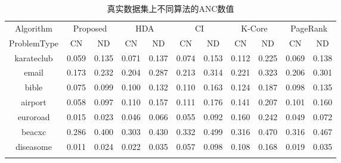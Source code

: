 \begin{table*}[hptb]
    \centering
    \begin{tabular}{ccccccccccc}
        \thickhline 
        Algorithm   & \multicolumn{2}{c}{Proposed} & \multicolumn{2}{c}{HDA} & \multicolumn{2}{c}{CI} & \multicolumn{2}{c}{K-Core} & \multicolumn{2}{c}{PageRank} \\
        ProblemType &      CN      &      ND       &     CN     &     ND     &     CN     &    ND     &     CN      &      ND      &      CN      &      ND       \\
        \hline
        karateclub  &     0.059    &     0.135     &    0.071   &    0.137   &   0.074    &   0.153   &    0.112    &     0.225    &     0.069    &     0.138     \\
        email       &     0.173    &     0.232     &    0.204   &    0.287   &   0.213    &   0.314   &    0.221    &     0.323    &     0.206    &     0.301     \\
        bible       &     0.075    &     0.099     &    0.100   &    0.132   &   0.110    &   0.163   &    0.124    &     0.187    &     0.098    &     0.135     \\
        airport     &     0.058    &     0.097     &    0.110   &    0.157   &   0.111    &   0.176   &    0.141    &     0.207    &     0.101    &     0.160     \\
        euroroad    &     0.015    &     0.023     &    0.046   &    0.066   &   0.055    &   0.092   &    0.160    &     0.242    &     0.049    &     0.072     \\
        beacxc      &     0.286    &     0.400     &    0.303   &    0.430   &   0.332    &   0.499   &    0.316    &     0.470    &     0.316    &     0.467     \\
        diseasome   &     0.011    &     0.024     &    0.022   &    0.035   &   0.057    &   0.098   &    0.108    &     0.168    &     0.019    &     0.035     \\
        \thickhline
        \end{tabular}
    \caption{真实数据集上不同算法的ANC数值}
    \label{table:真实数据集-ANCTable}
\end{table*}
